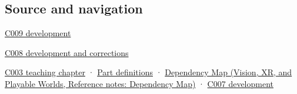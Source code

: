 \subsection{Source and navigation}\label{appendix-d52e4486f527-source-and-navigation}

\hyperref[appendix-fd090d982a15-m009---parts-127-147]{C009 development}

\hyperref[appendix-fd090d982a15-m008---parts-113-126]{C008 development and corrections}

\hyperref[01-foundations-i-ch002-where-the-bytes-live]{C003 teaching chapter} · \hyperref[appendix-fd090d982a15-m003---parts-41-60]{Part definitions} · \href{../07-Vision-XR-and-Playable-Worlds/main.pdf\#nameddest=appendix-4ad47bdd269a}{Dependency Map (Vision, XR, and Playable Worlds, Reference notes: Dependency Map)} · \hyperref[01-foundations-i-ch003-bringing-the-object-model-back-to-bytes]{C007 development}
